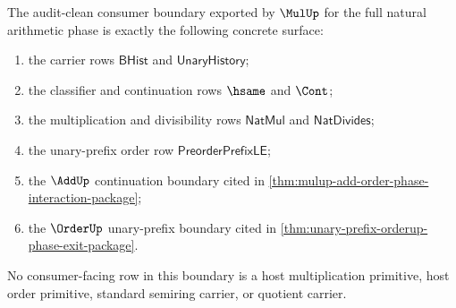 \begin{definition}
\label{def:mulup-audit-clean-consumer-boundary}
The audit-clean consumer boundary exported by $\MulUp$ for the full natural
arithmetic phase is exactly the following concrete surface:
\begin{enumerate}
\item the carrier rows $\mathsf{BHist}$ and $\mathsf{UnaryHistory}$;
\item the classifier and continuation rows $\hsame$ and $\Cont$;
\item the multiplication and divisibility rows $\mathsf{NatMul}$ and
$\mathsf{NatDivides}$;
\item the unary-prefix order row $\mathsf{PreorderPrefixLE}$;
\item the $\AddUp$ continuation boundary cited in
\autoref{thm:mulup-add-order-phase-interaction-package};
\item the $\OrderUp$ unary-prefix boundary cited in
\autoref{thm:unary-prefix-orderup-phase-exit-package}.
\end{enumerate}
No consumer-facing row in this boundary is a host multiplication primitive,
host order primitive, standard semiring carrier, or quotient carrier.
\end{definition}

